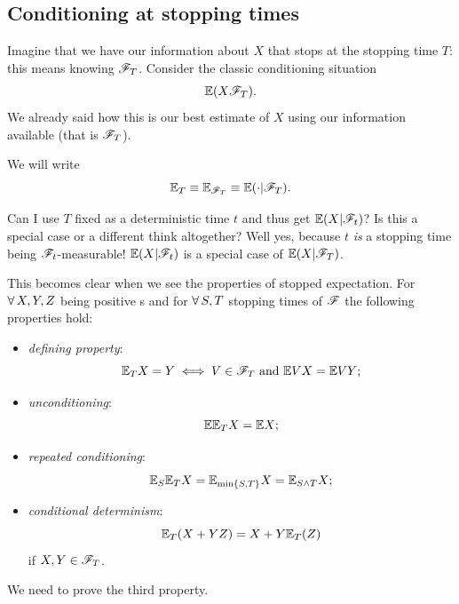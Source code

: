 \documentclass{report}
\begin{document}
\subsection{Conditioning at stopping times}
Imagine that we have our information about $X$ that stops at the stopping time $T$: this means knowing $\mathscr{F}_T$. Consider the classic conditioning situation
\[\mathbb{E}(X\mathscr{F}_T).\]
We already said how this is our best estimate of $X$ using our information available (that is $\mathscr{F}_T$).
\begin{notation}
	We will write
	\[\mathbb{E}_T\equiv\mathbb{E}_{\mathscr{F}_T}\equiv\mathbb{E}(\cdot|\mathscr{F}_T).\]
\end{notation}
\begin{remark}
	Can I use $T$ fixed as a deterministic time $t$ and thus get $\mathbb{E}(X|\mathscr{F}_t)$? Is this a special case or a different think altogether? Well yes, because $t$ \textit{is} a stopping time being $\mathscr{F}_t$-measurable! $\mathbb{E}(X|\mathscr{F}_t)$ is a special case of $\mathbb{E}(X|\mathscr{F}_T)$.
\end{remark}
This becomes clear when we see the properties of stopped expectation. For $\forall\, X,Y,Z$ being positive \rv s and for $\forall\, S,T$ stopping times of $\mathscr{F}$ the following properties hold:
\begin{itemize}
	\item \emph{defining property}:
	\[\mathbb{E}_T X=Y\iff V\in\mathscr{F}_T\text{ and }\mathbb{E} VX=\mathbb{E} VY;\]
	\item \emph{unconditioning}:
	\[\mathbb{E}\mathbb{E}_T X=\mathbb{E} X;\]
	\item \emph{repeated conditioning}:
	\[\mathbb{E}_S\mathbb{E}_T X=\mathbb{E}_{\min\{S,T\}}X=\mathbb{E}_{S\wedge T}X;\]
	\item \emph{conditional determinism}:
	\[\mathbb{E}_T(X+YZ)=X+Y\mathbb{E}_T(Z)\]
	if $X,Y\in\mathscr{F}_T$.
\end{itemize}
We need to prove the third property.
\end{document}
